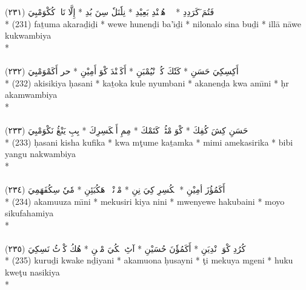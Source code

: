 \documentclass[a4paper, 12pt]{report}
\begin{document}
\begin{center}
\textarabic{(٢٣١) \textcolor{mygreen}{فَتُمَ َكَرَدِدِ  * وٖوٖ هُنٖنْدِ بَعِيْدِ  * نِلٗنَلٗ سِنَ بُدِ  * إِلَّا نَاوٖ كُكْوَمْبِيَ }} \\* 
(231) faṯuma akaraḏiḏi  * wewe hunenḏi ba'ı̄ḏi  * nilonalo sina buḏi  * illā nāwe kukwambiya  \\* 
 \\ 
\\[8mm] 

\textarabic{(٢٣٢) \textcolor{mygreen}{أَكِسِكِيَ حَسَنِ  * كَتٗكَ كُلٖ نْيُمْبَنِ  * أَكَنٖنْدَ كْوَ أَمِيْنِ  * حر أَكَمْوَمْبِيَ }} \\* 
(232) akisikiya ḥasani  * kaṯoka kule nyumbani  * akanenḏa kwa amı̄ni  * ḥr akamwambiya  \\* 
 \\ 
\\[8mm] 

\textarabic{(٢٣٣) \textcolor{mygreen}{حَسَنِ كِشَ كُفِكَ  * كْوَ مْٹُمٖ كَتَمْكَ  * مِمِ أَمٖكَسِرِكَ  * بِبِ يَنْڠُ نَكْوَمْبِيَ }} \\* 
(233) ḥasani kisha kufika  * kwa mţume kaṯamka  * mimi amekasirika  * bibi yangu nakwambiya  \\* 
 \\ 
\\[8mm] 

\textarabic{(٢٣٤) \textcolor{mygreen}{أَكَمُؤُزَ أمِيْنِ  * مٖكُسِرِ كِيَ نِنِ  * مْوٖنْيٖوٖ هَكُبَئِنِ  * مٗيٗ سِكُفَهَمِيَ }} \\* 
(234) akamuuza mı̄ni  * mekusiri kiya nini  * mwenyewe hakubaini  * moyo sikufahamiya  \\* 
 \\ 
\\[8mm] 

\textarabic{(٢٣٥) \textcolor{mygreen}{كُرُدِ كْوَكٖ نْدِيَنِ  * أَكَمُؤٗنَ حُسَيْنِ  * آٹِ مٖكُيَ مْڠٖنِ  * هُكُ كْوٖٹُ نَسِكِيَ }} \\* 
(235) kuruḏi kwake nḏiyani  * akamuona ḥusayni  * ţi mekuya mgeni  * huku kweţu nasikiya  \\* 
 \\ 
\\[8mm] 


\end{center}
\end{document}
